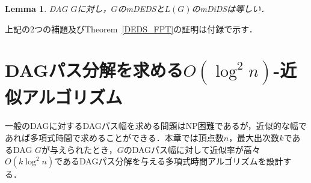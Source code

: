 \documentclass[master]{kuisthesis}		%
\theoremstyle{plain}
\newtheorem{lemma}{Lemma}
\theoremstyle{definition}
\begin{document}
\begin{lemma}\label{mDEDS_mDiDS}
    DAG $G$に対し，$G$のmDEDSと$L(G)$のmDiDSは等しい．
\end{lemma}

上記の2つの補題及びTheorem~\ref{DEDS_FPT}の証明は付録で示す．

\section{DAGパス分解を求める$O(\log ^2 n)$-近似アルゴリズム} %
一般のDAGに対するDAGパス幅を求める問題はNP困難であるが，近似的な幅であれば多項式時間で求めることができる．本章では頂点数$n$，最大出次数$k$であるDAG $G$が与えられたとき，$G$のDAGパス幅に対して近似率が高々$O(k\log ^2 n)$であるDAGパス分解を与える多項式時間アルゴリズムを設計する．
\end{document}
